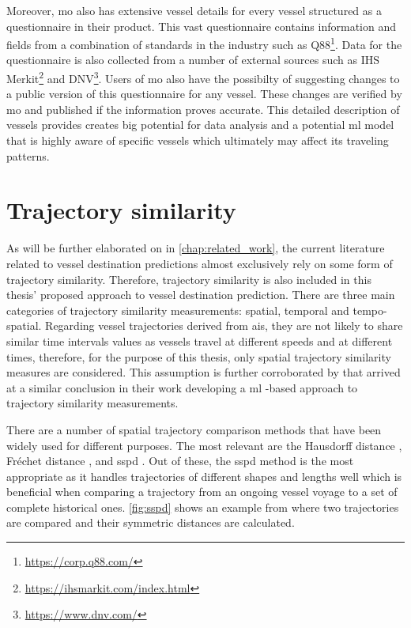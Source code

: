 Moreover, \acrshort{mo} also has extensive vessel details for every vessel structured as a questionnaire in their product. This vast questionnaire contains information and fields from a combination of standards in the industry such as Q88\footnote{\url{https://corp.q88.com/}}. Data for the questionnaire is also collected from a number of external sources such as IHS Merkit\footnote{\url{https://ihsmarkit.com/index.html}} and DNV\footnote{\url{https://www.dnv.com/}}. Users of \acrshort{mo} also have the possibilty of suggesting changes to a public version of this questionnaire for any vessel. These changes are verified by \acrshort{mo} and published if the information proves accurate. This detailed description of vessels provides creates big potential for data analysis and a potential \acrshort{ml} model that is highly aware of specific vessels which ultimately may affect its traveling patterns.


\section{Trajectory similarity}

As will be further elaborated on in \cref{chap:related_work}, the current literature related to vessel destination predictions almost exclusively rely on some form of trajectory similarity. Therefore, trajectory similarity is also included in this thesis' proposed approach to vessel destination prediction. There are three main categories of trajectory similarity measurements: spatial, temporal and tempo-spatial. Regarding vessel trajectories derived from \acrshort{ais}, they are not likely to share similar time intervals values as vessels travel at different speeds and at different times, therefore, for the purpose of this thesis, only spatial trajectory similarity measures are considered. This assumption is further corroborated by \cite{ZHANG2020102729} that arrived at a similar conclusion in their work developing a \acrfull{ml} -based approach to trajectory similarity measurements.

There are a number of spatial trajectory comparison methods that have been widely used for different purposes. The most relevant are the Hausdorff distance \parencite{magdy2015}, Fréchet distance \parencite{magdy2015}, and \acrfull{sspd} \parencite{besse2015review}. Out of these, the \acrshort{sspd} method is the most appropriate as it handles trajectories of different shapes and lengths well which is beneficial when comparing a trajectory from an ongoing vessel voyage to a set of complete historical ones. \cref{fig:sspd} shows an example from \cite{besse2015review} where two trajectories are compared and their symmetric distances are calculated.

